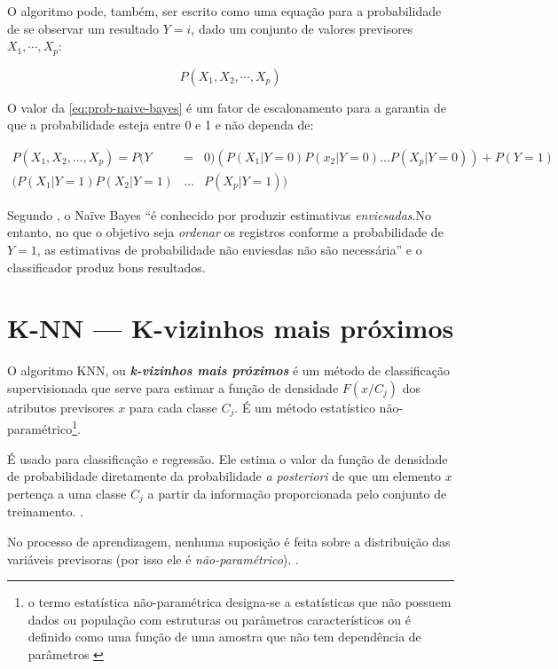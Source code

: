 O algoritmo pode, também, ser escrito como uma equação para a probabilidade de se observar um resultado $ Y = i $, dado um conjunto de valores previsores $ X_1, \cdots, X_p $:

\begin{equation}\label{eq:prob-naive-bayes}
  P(X_1, X_2, \cdots, X_p)
\end{equation} 

O valor da \autoref{eq:prob-naive-bayes} é um fator de escalonamento para a garantia de que a probabilidade esteja entre 0 e 1 e não dependa de:

\begin{eqnarray}
P(X_1, X_2, \dots, X_p)=P(Y&=&0)(P(X_1 | Y = 0)P(x_2 | Y = 0) \dots P(X_p| Y = 0)) + P(Y=1)\nonumber\\
(P(X_1 | Y = 1)P(X_2 | Y = 1) &\dots &P(X_p | Y = 1))\end{eqnarray}

Segundo , o Naïve Bayes ``é conhecido por produzir estimativas \textit{enviesadas}.No entanto, no que o objetivo seja \textit{ordenar} os registros conforme a probabilidade de $ Y = 1 $, as estimativas de probabilidade não enviesdas não são necessária'' e o classificador produz bons resultados.

\section{K-NN --- K-vizinhos mais próximos}\label{sec:knn}
O algoritmo KNN, ou \textit{\textbf{k-vizinhos mais próximos}} é um método de classificação supervisionada que serve para estimar a função de densidade $ F(x/C_j) $ dos atributos previsores $ x $ para cada classe $ C_j $. É um método estatístico não-paramétrico\footnote{o termo estatística não-paramétrica designa-se a estatísticas que não possuem dados ou população com estruturas ou parâmetros característicos ou é definido como uma função de uma amostra que não tem dependência de parâmetros \cite{bruce_estatistica_2019}}. \cite{Boscarioli2017} \cite{goldschmidt2005}

É usado para classificação e regressão. Ele estima o valor da função de densidade de probabilidade diretamente da probabilidade \textit{a posteriori} de que um elemento $x$ pertença a uma classe $C_j$ a partir da informação proporcionada pelo conjunto de treinamento. \cite{Boscarioli2017} \cite{bruce_estatistica_2019}.

No processo de aprendizagem, nenhuma suposição é feita sobre a distribuição das variáveis previsoras (por isso ele é \textit{não-paramétrico}). \cite{Boscarioli2017} \cite{goldschmidt2005} \cite{wu2007} \cite{bruce_estatistica_2019}. 

